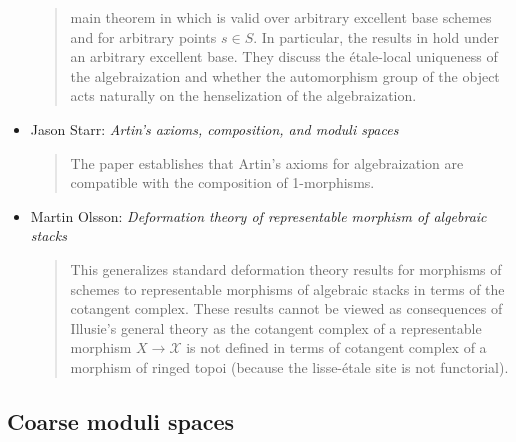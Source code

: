 \begin{itemize}
\begin{quote}
main theorem in \cite{ArtinI} which is valid over arbitrary
excellent base schemes and for arbitrary points $s \in S$.
In particular, the results in \cite{ArtinVersal} hold under an arbitrary
excellent base. They discuss the \'etale-local uniqueness of the
algebraization and whether the automorphism group of the object acts naturally
on the henselization of the algebraization.
\end{quote}
\item Jason Starr: \emph{Artin's axioms, composition, and moduli spaces}
\cite{starr_artin}
\begin{quote}
The paper establishes that Artin's axioms for algebraization are compatible
with the composition of 1-morphisms.
\end{quote}
\item Martin Olsson: \emph{Deformation theory of representable
morphism of algebraic stacks} \cite{olsson_deformation}
\begin{quote}
This generalizes standard deformation theory results for morphisms of schemes
to representable morphisms of algebraic stacks in terms of the cotangent
complex. These results cannot be viewed as consequences of Illusie's general
theory as the cotangent complex of a representable morphism $X \to \mathcal{X}$
is not
defined in terms of cotangent complex of a morphism of ringed topoi (because
the lisse-\'etale site is not functorial).
\end{quote}
\end{itemize}

\subsection{Coarse moduli spaces}
\label{subsection-coarse-moduli-spaces}


